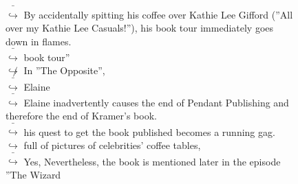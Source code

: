 \documentclass[11pt,a4paper, onecolumn]{article}
\begin{document}
\begin{figure}[t] \small \begin{tcolorbox}[boxsep=0pt,left=5pt,right=0pt,top=2pt,colback = yellow!5] \begin{dialogue}
 \small 
\colorbox{pink!25}{ $\bar{\hookrightarrow}$}
{ By accidentally spitting his coffee over Kathie Lee Gifford (''All over my Kathie Lee Casuals!''), his book tour immediately goes down in flames. }
\\
\colorbox{pink!25}{ $\bar{\hookrightarrow}$}
{ book tour'' }
\\
\colorbox{pink!25}{$\not\hookrightarrow$}
{ In ''The Opposite'', }
\\
\colorbox{pink!25}{ $\bar{\hookrightarrow}$}
{ Elaine }
\\
\colorbox{pink!25}{ $\bar{\hookrightarrow}$}
{ Elaine inadvertently causes the end of Pendant Publishing and therefore the end of Kramer's book. }
\\
\colorbox{pink!25}{ $\bar{\hookrightarrow}$}
{ his quest to get the book published becomes a running gag. }
\\
\colorbox{pink!25}{$\hookrightarrow$}
{ full of pictures of celebrities' coffee tables, }
\\
\colorbox{pink!25}{ $\bar{\hookrightarrow}$}
\colorbox{red!25}{Yes,}
{ Nevertheless, the book is mentioned later in the episode ''The Wizard }
 \end{dialogue}\end{tcolorbox}\end{figure}
\end{document}
